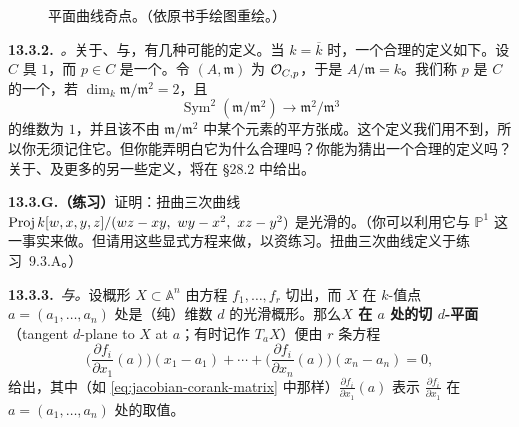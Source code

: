 \begin{figure}[htbp]
\centering
{}
\caption{平面曲线奇点。（依原书手绘图重绘。）}\label{fig:plane-curve-singularities}
\end{figure}

\textbf{13.3.2.}\ \emph{\trhRemark{}。}\quad 关于\trNode、\trCusp{}与\trTacnode，有几种可能的定义。当 $k=\overline{k}$ 时，一个合理的定义如下。设 $C$ 具\trPureDimension{} $1$，而 $p\in C$ 是一个\trClosedPoint。令 $(A,\mathfrak{m})$ 为\trLocalRing{} $\mathcal{O}_{C,p}$，于是 $A/\mathfrak{m}=k$。我们称 $p$ 是 $C$ 的一个\textbf{\trNode}，若 $\dim_k\mathfrak{m}/\mathfrak{m}^2=2$，且
\[
\operatorname{Sym}^2(\mathfrak{m}/\mathfrak{m}^2)\longrightarrow\mathfrak{m}^2/\mathfrak{m}^3
\]
的\trKernel{}维数为 $1$，并且该\trKernel{}不由 $\mathfrak{m}/\mathfrak{m}^2$ 中某个元素的平方张成。这个定义我们用不到，所以你无须记住它。但你能弄明白它为什么合理吗？你能为\trCusp{}猜出一个合理的定义吗？关于\trNode、\trCusp{}及更多的另一些定义，将在 \S28.2 中给出。

\textbf{13.3.G.（练习）}\quad 证明：扭曲三次曲线 $\operatorname{Proj} k[w,x,y,z]/(wz-xy,\ wy-x^2,\ xz-y^2)$ 是光滑的。（你可以利用它与 $\mathbb{P}^1$ \trIsomorphic{}这一事实来做。但请用这些显式方程来做，以资练习。扭曲三次曲线定义于\mbox{练习~9.3.A}。）

\textbf{13.3.3.}\ \emph{\trTangentPlane{}与\trTangentLine。}\quad 设概形 $X\subset\mathbb{A}^n$ 由方程 $f_1,\dots,f_r$ 切出，而 $X$ 在 $k$-值点 $a=(a_1,\dots,a_n)$ 处是（纯）维数 $d$ 的光滑概形。那么\textbf{$X$ 在 $a$ 处的切 $d$-平面}（tangent $d$-plane to $X$ at $a$；有时记作 $T_aX$）便由 $r$ 条方程
\[
\biggl(\frac{\partial f_i}{\partial x_1}(a)\biggr)(x_1-a_1)+\cdots+\biggl(\frac{\partial f_i}{\partial x_n}(a)\biggr)(x_n-a_n)=0,
\]
给出，其中（如 \eqref{eq:jacobian-corank-matrix} 中那样）$\frac{\partial f_i}{\partial x_1}(a)$ 表示 $\frac{\partial f_i}{\partial x_1}$ 在 $a=(a_1,\dots,a_n)$ 处的取值。

